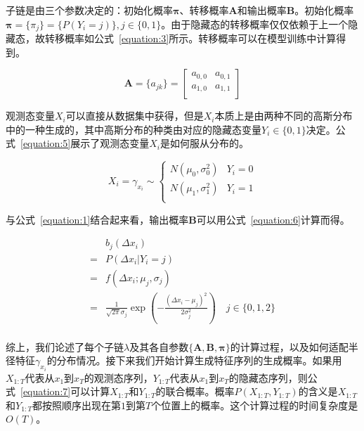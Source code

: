 子链是由三个参数决定的：初始化概率$\mathbf{\pi}$、转移概率$\mathbf{A}$和输出概率$\mathbf{B}$。初始化概率$\mathbf{\pi} = \{\pi_j\} = \{P(Y_i = j)\}, j \in \{0,1\}$。由于隐藏态的转移概率仅仅依赖于上一个隐藏态，故转移概率如公式~\eqref{equation:3}所示。转移概率可以在模型训练中计算得到。

\begin{equation}
\label{equation:3}
\mathbf{A} = \{a_{jk}\} = 
\begin{bmatrix}
a_{0,0}	&	a_{0,1}	\\
a_{1,0}	&	a_{1,1}	\\
\end{bmatrix}
\end{equation}

观测态变量$X_i$可以直接从数据集中获得，但是$X_i$本质上是由两种不同的高斯分布中的一种生成的，其中高斯分布的种类由对应的隐藏态变量$Y_i \in \{0,1\}$决定。公式~\eqref{equation:5}展示了观测态变量$X_i$是如何服从分布的。

\begin{equation}
\label{equation:5}
X_i = \gamma_{x_i} \sim 
\begin{cases}
N(\mu_0, \sigma_0^2)     &     Y_i = 0	\\
N(\mu_1, \sigma_1^2)     &     Y_i = 1	\\
\end{cases} 	
\end{equation}

与公式~\eqref{equation:1}结合起来看，输出概率$\mathbf{B}$可以用公式~\eqref{equation:6}计算而得。


\begin{equation}
\label{equation:6}
\begin{aligned}	
&b_j(\Delta{x_i})\\
= &P(\Delta{x_i} | Y_i = j)\\
= &f(\Delta{x_i};\mu_j, \sigma_j) \\
= &\frac{1}{\sqrt{2\pi}\sigma_j}\exp{(-\frac{(\Delta{x_i}-\mu_j)^2}{2\sigma_j^2})} \quad j \in \{0,1,2\}\\
\end{aligned}
\end{equation}

综上，我们论述了每个子链$\lambda$及其各自参数$\{\mathbf{A}, \mathbf{B}, \mathbf{\pi}\}$的计算过程，以及如何适配半径特征$\gamma_{x_i}$的分布情况。接下来我们开始计算生成特征序列的生成概率。如果用$X_{1:T}$代表从$x_1$到$x_T$的观测态序列，$Y_{1:T}$代表从$x_1$到$x_T$的隐藏态序列，则公式~\eqref{equation:7}可以计算$X_{1:T}$和$Y_{1:T}$的联合概率。概率$P(X_{1:T}, Y_{1:T})$的含义是$X_{1:T}$和$Y_{1:T}$都按照顺序出现在第$1$到第$T$个位置上的概率。这个计算过程的时间复杂度是$O(T)$。


